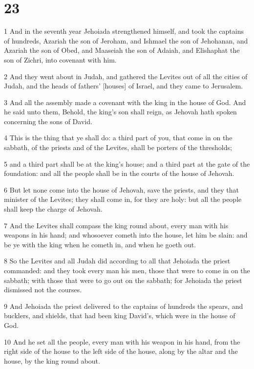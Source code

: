 \chapter{23}

\par 1 And in the seventh year Jehoiada strengthened himself, and took the captains of hundreds, Azariah the son of Jeroham, and Ishmael the son of Jehohanan, and Azariah the son of Obed, and Maaseiah the son of Adaiah, and Elishaphat the son of Zichri, into covenant with him.
\par 2 And they went about in Judah, and gathered the Levites out of all the cities of Judah, and the heads of fathers' [houses] of Israel, and they came to Jerusalem.
\par 3 And all the assembly made a covenant with the king in the house of God. And he said unto them, Behold, the king's son shall reign, as Jehovah hath spoken concerning the sons of David.
\par 4 This is the thing that ye shall do: a third part of you, that come in on the sabbath, of the priests and of the Levites, shall be porters of the thresholds;
\par 5 and a third part shall be at the king's house; and a third part at the gate of the foundation: and all the people shall be in the courts of the house of Jehovah.
\par 6 But let none come into the house of Jehovah, save the priests, and they that minister of the Levites; they shall come in, for they are holy: but all the people shall keep the charge of Jehovah.
\par 7 And the Levites shall compass the king round about, every man with his weapons in his hand; and whosoever cometh into the house, let him be slain: and be ye with the king when he cometh in, and when he goeth out.
\par 8 So the Levites and all Judah did according to all that Jehoiada the priest commanded: and they took every man his men, those that were to come in on the sabbath; with those that were to go out on the sabbath; for Jehoiada the priest dismissed not the courses.
\par 9 And Jehoiada the priest delivered to the captains of hundreds the spears, and bucklers, and shields, that had been king David's, which were in the house of God.
\par 10 And he set all the people, every man with his weapon in his hand, from the right side of the house to the left side of the house, along by the altar and the house, by the king round about.
